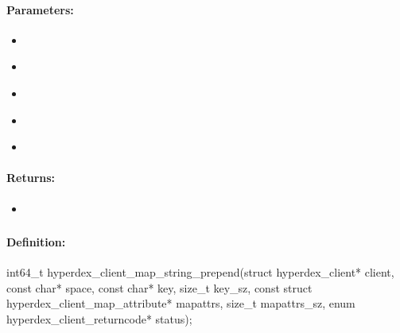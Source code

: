 \paragraph{Parameters:}
\begin{itemize}[noitemsep]
\item {}\\

\item {}\\

\item {}\\

\item {}\\

\item {}\\

\end{itemize}

\paragraph{Returns:}
\begin{itemize}[noitemsep]
\item {}\\

\end{itemize}

\pagebreak
\subsubsection{}
\label{api:c:map_string_prepend}


\paragraph{Definition:}
\begin{ccode}
int64_t hyperdex_client_map_string_prepend(struct hyperdex_client* client,
        const char* space,
        const char* key, size_t key_sz,
        const struct hyperdex_client_map_attribute* mapattrs, size_t mapattrs_sz,
        enum hyperdex_client_returncode* status);
\end{ccode}

